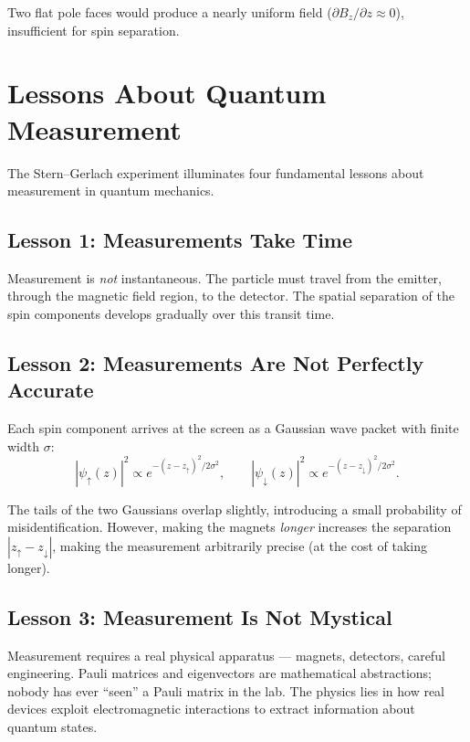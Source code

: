 \documentclass[11pt,a4paper]{article}
\theoremstyle{definition}
\theoremstyle{plain}
\theoremstyle{remark}
\begin{document}
Two flat pole faces would produce a nearly uniform field ($\partial B_z/\partial z \approx 0$), insufficient for spin separation.

\section{Lessons About Quantum Measurement}

The Stern--Gerlach experiment illuminates four fundamental lessons about measurement in quantum mechanics.

\subsection{Lesson 1: Measurements Take Time}

Measurement is \emph{not} instantaneous. The particle must travel from the emitter, through the magnetic field region, to the detector. The spatial separation of the spin components develops gradually over this transit time.

\subsection{Lesson 2: Measurements Are Not Perfectly Accurate}

Each spin component arrives at the screen as a Gaussian wave packet with finite width $\sigma$:
\[
    |\psi_\uparrow(z)|^2 \propto e^{-(z - z_\uparrow)^2 / 2\sigma^2}, \qquad |\psi_\downarrow(z)|^2 \propto e^{-(z - z_\downarrow)^2 / 2\sigma^2}.
\]

The tails of the two Gaussians overlap slightly, introducing a small probability of misidentification. However, making the magnets \emph{longer} increases the separation $|z_\uparrow - z_\downarrow|$, making the measurement arbitrarily precise (at the cost of taking longer).

\subsection{Lesson 3: Measurement Is Not Mystical}

Measurement requires a real physical apparatus --- magnets, detectors, careful engineering. Pauli matrices and eigenvectors are mathematical abstractions; nobody has ever ``seen'' a Pauli matrix in the lab. The physics lies in how real devices exploit electromagnetic interactions to extract information about quantum states.
\end{document}
